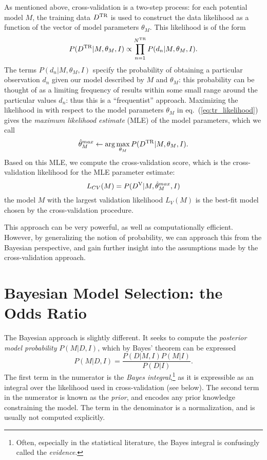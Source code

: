\documentclass[12pt]{article}
\newcommand{\Dtr}{\ensuremath{D^{\rm TR}}}
\newcommand{\Dva}{\ensuremath{D^{\rm V}}}
\newcommand{\eqn}[1]{eq.~(\ref{eq:#1})}
\begin{document}
As mentioned above, cross-validation is a two-step process:
for each potential model $M$, the
training data \Dtr{} is used to construct the data likelihood as a function
of the vector of model parameters $\theta_M$.  This likelihood is of the form
\begin{equation}
  \label{eq:tr_likelihood}
  P(\Dtr|M, \theta_M, I) \propto \prod_{n=1}^{N^{\rm TR}}P(d_n|M, \theta_M, I).
\end{equation}
The terms $P(d_n|M, \theta_M, I)$ specify the probability of obtaining a
particular observation $d_n$ given our model described by $M$ and $\theta_M$:
this probability can be thought of as a limiting frequency of results within
some small range around the particular values $d_n$: thus this is a
``frequentist'' approach.
Maximizing the likelihood in with respect to the model parameters $\theta_M$
in \eqn{tr_likelihood} gives the {\it maximum likelihood estimate} (MLE)
of the model parameters, which we call
\begin{equation}
  \hat{\theta}_M^{max} \leftarrow \arg\max_{\theta_M} P(\Dtr|M, \theta_M, I).
\end{equation}
Based on this MLE, we compute the cross-validation score, which is the
cross-validation likelihood for the MLE parameter estimate:
\begin{equation}
  \label{eq:CV_likelihood}
  L_{CV}(M) = P(\Dva|M, \hat{\theta}_M^{max}, I)
\end{equation}
the model $M$ with the largest validation likelihood $L_{V}(M)$ is the
best-fit model chosen by the cross-validation procedure.

This approach can be very powerful, as well as computationally efficient.
However, by generalizing the notion of probability, we can approach this
from the Bayesian perspective, and gain further insight into the assumptions
made by the cross-validation approach.

\section{Bayesian Model Selection: the Odds Ratio}
The Bayesian approach is slightly different.  It seeks to compute the
{\it posterior model probability} $P(M|D,I)$, which by Bayes' theorem
can be expressed
\begin{equation}
  \label{eq:bayes_theorem}
  P(M|D,I) = \frac{P(D|M,I)P(M|I)}{P(D|I)}.
\end{equation}
The first term in the numerator is the {\it Bayes integral},\footnote{
Often, especially in the statistical literature,
the Bayes integral is confusingly called the {\it evidence}.}
as it is expressible as an integral over the likelihood used
in cross-validation (see below).
The second term in the numerator is known
as the {\it prior}, and encodes any prior knowledge constraining the model.
The term in the denominator is a normalization, and is usually not
computed explicitly.
\end{document}
